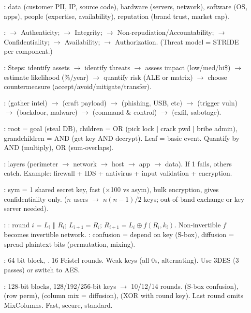 : data (customer PII, IP, source code), hardware (servers, network), software (OS, apps), people (expertise, availability), reputation (brand trust, market cap).

:
 $\to$ Authenticity;  $\to$ Integrity;  $\to$ Non-repudiation/Accountability;  $\to$ Confidentiality;  $\to$ Availability;  $\to$ Authorization. (Threat model = STRIDE per component.)

: Steps: identify assets $\to$ identify threats $\to$ assess impact (low/med/hi\$) $\to$ estimate likelihood (\%/year) $\to$ quantify risk (ALE or matrix) $\to$ choose countermeasure (accept/avoid/mitigate/transfer).

:  (gather intel) $\to$  (craft payload) $\to$  (phishing, USB, etc) $\to$  (trigger vuln) $\to$  (backdoor, malware) $\to$  (command \& control) $\to$  (exfil, sabotage). 

: root = goal (steal DB), children = OR (pick lock $\mid$ crack pwd $\mid$ bribe admin), grandchildren = AND (get key AND decrypt). Leaf = basic event. Quantify by AND (multiply), OR (sum-overlaps).

: layers (perimeter $\to$ network $\to$ host $\to$ app $\to$ data). If 1 fails, others catch. Example: firewall + IDS + antivirus + input validation + encryption.


: sym = 1 shared secret key, fast ($\times$100 vs asym), bulk encryption, gives confidentiality only.  ($n$ users $\to$ $n(n-1)/2$ keys; out-of-band exchange or key server needed).

: : round $i$ = $L_i \parallel R_i$; $L_{i+1}=R_i$; $R_{i+1}=L_i \oplus f(R_i, k_i)$. Non-invertible $f$ becomes invertible network. : confusion = depend on key (S-box), diffusion = spread plaintext bits (permutation, mixing).

: 64-bit block, . 16 Feistel rounds. Weak keys (all 0s, alternating). Use 3DES (3 passes) or switch to AES.

: 128-bit blocks, 128/192/256-bit keys $\to$ 10/12/14 rounds.  (S-box confusion),  (row perm),  (column mix = diffusion),  (XOR with round key). Last round omits MixColumns. Fast, secure, standard.

